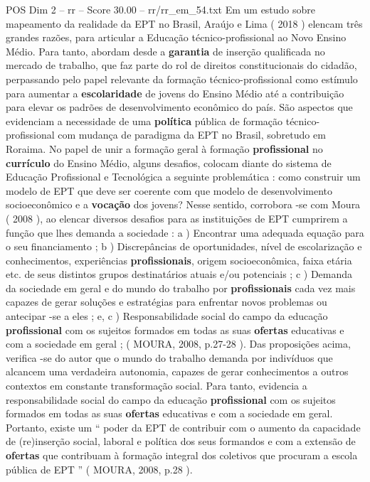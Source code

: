 \begin{textsample}{POS Dim 2 – rr – Score 30.00 – rr/rr\_em\_54.txt}
Em um estudo sobre mapeamento da realidade da EPT no Brasil, Araújo e Lima ( 2018 ) elencam três grandes razões, para articular a Educação técnico-profissional ao Novo Ensino Médio.
Para tanto, abordam desde a \textbf{garantia} de inserção qualificada no mercado de trabalho, que faz parte do rol de direitos constitucionais do cidadão, perpassando pelo papel relevante da formação técnico-profissional como estímulo para aumentar a \textbf{escolaridade} de jovens do Ensino Médio até a contribuição para elevar os padrões de desenvolvimento econômico do país.
São aspectos que evidenciam a necessidade de uma \textbf{política} pública de formação técnico-profissional com mudança de paradigma da EPT no Brasil, sobretudo em Roraima.
No papel de unir a formação geral à formação \textbf{profissional} no \textbf{currículo} do Ensino Médio, alguns desafios, colocam diante do sistema de Educação Profissional e Tecnológica a seguinte problemática : como construir um modelo de EPT que deve ser coerente com que modelo de desenvolvimento socioeconômico e a \textbf{vocação} dos jovens?
Nesse sentido, corrobora -se com Moura ( 2008 ), ao elencar diversos desafios para as instituições de EPT cumprirem a função que lhes demanda a sociedade : a ) Encontrar uma adequada equação para o seu financiamento ; b ) Discrepâncias de oportunidades, nível de escolarização e conhecimentos, experiências \textbf{profissionais}, origem socioeconômica, faixa etária etc. de seus distintos grupos destinatários atuais e/ou potenciais ; c ) Demanda da sociedade em geral e do mundo do trabalho por \textbf{profissionais} cada vez mais capazes de gerar soluções e estratégias para enfrentar novos problemas ou antecipar -se a eles ; e, c ) Responsabilidade social do campo da educação \textbf{profissional} com os sujeitos formados em todas as suas \textbf{ofertas} educativas e com a sociedade em geral ; ( MOURA, 2008, p.27-28 ).
Das proposições acima, verifica -se do autor que o mundo do trabalho demanda por indivíduos que alcancem uma verdadeira autonomia, capazes de gerar conhecimentos a outros contextos em constante transformação social.
Para tanto, evidencia a responsabilidade social do campo da educação \textbf{profissional} com os sujeitos formados em todas as suas \textbf{ofertas} educativas e com a sociedade em geral.
Portanto, existe um “ poder da EPT de contribuir com o aumento da capacidade de (re)inserção social, laboral e política dos seus formandos e com a extensão de \textbf{ofertas} que contribuam à formação integral dos coletivos que procuram a escola pública de EPT ” ( MOURA, 2008, p.28 ).

\end{textsample}
